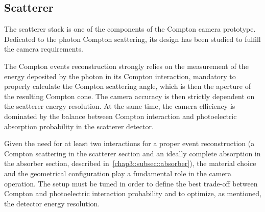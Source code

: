 
\subsection{Scatterer}\label{chap3::subsec::scatterer} 
The scatterer stack is one of the components of the Compton camera prototype. Dedicated to the photon Compton scattering, its design has been studied to fulfill the camera requirements.

The Compton events reconstruction strongly relies on the measurement of the energy deposited by the photon in its Compton interaction, mandatory to properly calculate the Compton scattering angle, which is then the aperture of the resulting Compton cone. The camera accuracy is then strictly dependent on the scatterer energy resolution. At the same time, the camera efficiency is dominated by the balance between Compton interaction and photoelectric absorption probability in the scatterer detector.

Given the need for at least two interactions for a proper event reconstruction (a Compton scattering in the scatterer section and an ideally complete absorption in the absorber section, described in~\ref{chap3::subsec::absorber}), the material choice and the geometrical configuration play a fundamental role in the camera operation. The setup must be tuned in order to define the best trade-off between Compton and photoelectric interaction probability and to optimize, as mentioned, the detector energy resolution.

